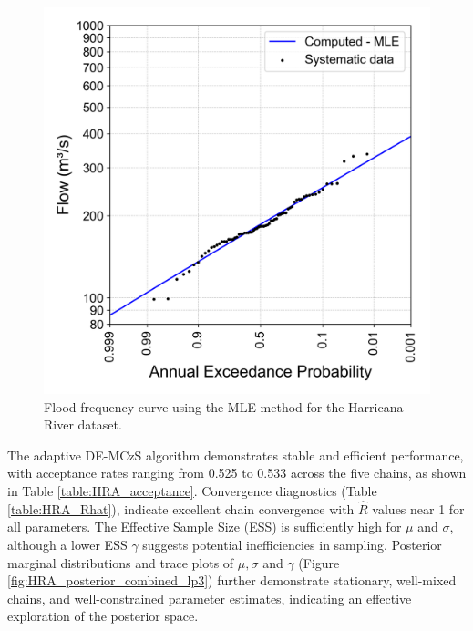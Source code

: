 \begin{figure}[ht!]
    \centering
    \includegraphics[width=1\linewidth]{_plots/HRA_flood_quantiles_MLE.png}
    \caption{Flood frequency curve using the MLE method for the Harricana River dataset.}
    \label{fig:HRA_flood_quantiles_MLE}
\end{figure}

The adaptive DE-MCzS algorithm demonstrates stable and efficient performance, with acceptance rates ranging from 0.525 to 0.533 across the five chains, as shown in Table \ref{table:HRA_acceptance}. Convergence diagnostics (Table \ref{table:HRA_Rhat}), indicate excellent chain convergence with $\hat{R}$ values near 1 for all parameters. The Effective Sample Size (ESS) is sufficiently high for $\mu$ and $\sigma$, although a lower ESS $\gamma$ suggests potential inefficiencies in sampling. Posterior marginal distributions and trace plots of $\mu, \sigma$ and $\gamma$ (Figure \ref{fig:HRA_posterior_combined_lp3}) further demonstrate stationary, well-mixed chains, and well-constrained parameter estimates, indicating an effective exploration of the posterior space.

